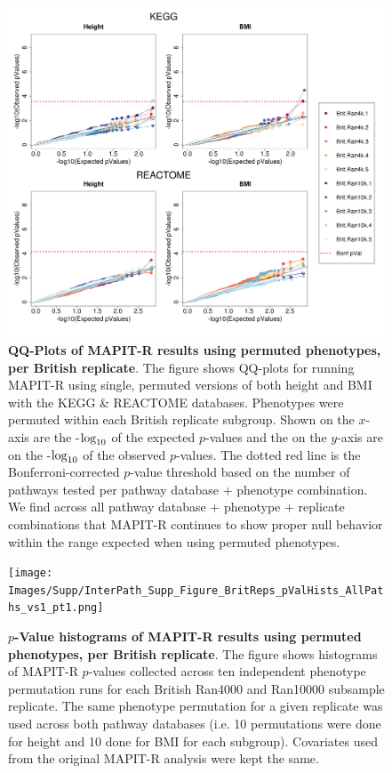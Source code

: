 \documentclass[12pt,a4paper]{article}
\def\log{{\rm log}}
\begin{document}
\begin{figure}[htbp]
\centering
\includegraphics[scale=.35]{Images/Supp/InterPath_Supp_Figure_BritReps_perm1_QQPlots_AllPaths_vs1.png}
\caption[TBD]{\textbf{QQ-Plots of MAPIT-R results using permuted phenotypes, per British replicate}. The figure shows QQ-plots for running MAPIT-R using single, permuted versions of both height and BMI with the KEGG \& REACTOME databases. Phenotypes were permuted within each British replicate subgroup. Shown on the $x$-axis are the -$\log_{10}$ of the expected $p$-values and the on the $y$-axis are on the -$\log_{10}$ of the observed $p$-values. The dotted red line is the Bonferroni-corrected $p$-value threshold based on the number of pathways tested per pathway database + phenotype combination. We find across all pathway database + phenotype + replicate combinations that MAPIT-R continues to show proper null behavior within the range expected when using permuted phenotypes.}
\label{InterPath-Supp-Figure-BritReps-perm1-QQPlots-AllPaths}
\end{figure}
\clearpage

\setcounter{CharNumber3}{1}
\setlength{\footskip}{1cm}
\begin{figure}[htbp]
\centering
\vspace*{-1cm}
\texttt{[image: Images/Supp/InterPath\_Supp\_Figure\_BritReps\_pValHists\_AllPaths\_vs1\_pt1.png]}
\caption[TBD]{\textbf{$p$-Value histograms of MAPIT-R results using permuted phenotypes, per British replicate}. The figure shows histograms of MAPIT-R $p$-values collected across ten independent phenotype permutation runs for each British Ran4000 and Ran10000 subsample replicate. The same phenotype permutation for a given replicate was used across both pathway databases (i.e. 10 permutations were done for height and 10 done for BMI for each subgroup). Covariates used from the original MAPIT-R analysis were kept the same.}
\label{InterPath-Supp-Figure-BritReps-10perms-pValHists-pt1}
\end{figure}
\clearpage
\setlength{\footskip}{1cm}
\addtocounter{figure}{-1}
\addtocounter{CharNumber3}{1}
\end{document}
